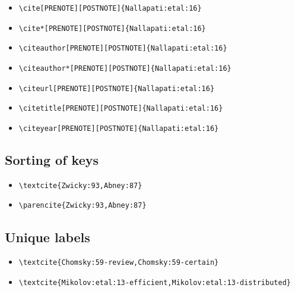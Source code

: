 \begin{itemize}
\item \verb=\cite[PRENOTE][POSTNOTE]{Nallapati:etal:16}= \newline  \cite[PRENOTE][POSTNOTE]{Nallapati:etal:16}
\item \verb=\cite*[PRENOTE][POSTNOTE]{Nallapati:etal:16}= \newline  \cite*[PRENOTE][POSTNOTE]{Nallapati:etal:16}
\item \verb=\citeauthor[PRENOTE][POSTNOTE]{Nallapati:etal:16}= \newline \citeauthor[PRENOTE][POSTNOTE]{Nallapati:etal:16}
\item \verb=\citeauthor*[PRENOTE][POSTNOTE]{Nallapati:etal:16}= \newline \citeauthor*[PRENOTE][POSTNOTE]{Nallapati:etal:16}
\item \verb=\citeurl[PRENOTE][POSTNOTE]{Nallapati:etal:16}= \newline {}
\item \verb=\citetitle[PRENOTE][POSTNOTE]{Nallapati:etal:16}= \newline {}
\item \verb=\citeyear[PRENOTE][POSTNOTE]{Nallapati:etal:16}= \newline \citeyear[PRENOTE][POSTNOTE]{Nallapati:etal:16}
\end{itemize} 

\subsection{Sorting of keys}

\begin{itemize}
\item \verb=\textcite{Zwicky:93,Abney:87}= \newline \textcite{Zwicky:93,Abney:87}
\item \verb=\parencite{Zwicky:93,Abney:87}= \newline \parencite{Zwicky:93,Abney:87}
\end{itemize}

\subsection{Unique labels}

\begin{itemize}
\item \verb=\textcite{Chomsky:59-review,Chomsky:59-certain}= \newline \textcite{Chomsky:59-review,Chomsky:59-certain}
\item \verb=\textcite{Mikolov:etal:13-efficient,Mikolov:etal:13-distributed}= \newline \textcite{Mikolov:etal:13-efficient,Mikolov:etal:13-distributed}
\end{itemize}
